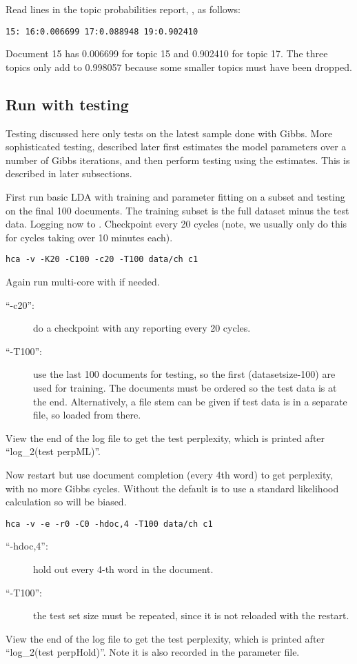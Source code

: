 \documentclass[a4paper,english]{article}
\begin{document}
Read lines in the topic probabilities report, , as follows:
\begin{verbatim}
15: 16:0.006699 17:0.088948 19:0.902410
\end{verbatim} 
Document 15 has 0.006699 for topic 15 and 0.902410 for topic 17.
The three topics only add to 0.998057 because some
smaller topics must have been dropped.

\subsection{Run with testing}

Testing discussed here only tests on the latest sample done with
Gibbs.  More sophisticated testing, described later
first estimates the model parameters over a number of Gibbs
iterations, and then perform testing using the estimates.
This is described in later subsections.

First run basic LDA with training and parameter fitting on a subset
and testing on the final 100 documents.  
The training subset is the full dataset minus the test data.
Logging now to .
Checkpoint every 20 cycles
(note, we usually only do this for cycles taking over 10 minutes each).
\begin{verbatim}
hca -v -K20 -C100 -c20 -T100 data/ch c1
\end{verbatim}
Again run multi-core with  if needed.
\begin{description}
\item[``-c20'':] do a checkpoint with any reporting every
20 cycles.
\item[``-T100'':] use the last 100 documents for testing,
so the first (datasetsize-100) are used for training.
The documents must be ordered so the test data is at the end.
Alternatively, a file stem can be given if test data is in a 
separate file, so loaded from there.
\end{description}
View the end of the log file to get the test perplexity,
which is printed after ``log\_2(test perpML)''.

Now restart but use document completion (every 4th word) to 
get perplexity, with no more Gibbs cycles.
Without  the default is to use
a standard likelihood calculation so will be biased.
\begin{verbatim}
hca -v -e -r0 -C0 -hdoc,4 -T100 data/ch c1
\end{verbatim}
\begin{description}
\item[``-hdoc,4'':] hold out every 4-th word in
the document.
\item[``-T100'':] the test set size must be repeated, since it is not
reloaded with the restart.
\end{description}
View the end of the log file to get the test perplexity,
which is printed after ``log\_2(test perpHold)''.
Note it is also recorded in the parameter file.
\end{document}
